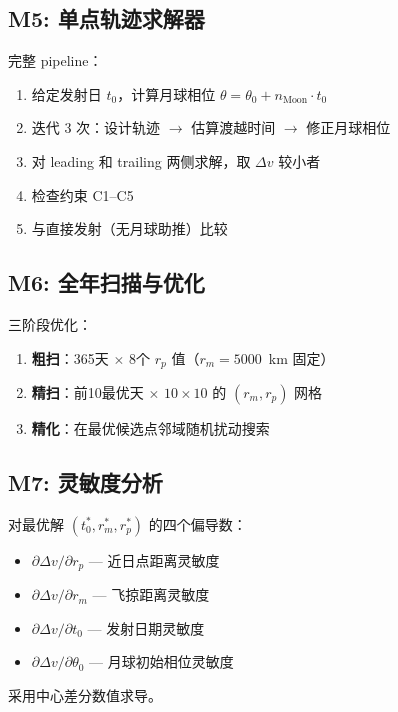 \documentclass[a4paper,12pt]{article}
\begin{document}
\subsection{M5: 单点轨迹求解器}\label{sec:m5}

完整 pipeline：
\begin{enumerate}
  \item 给定发射日 $t_0$，计算月球相位
        $\theta = \theta_0 + n_{\mathrm{Moon}} \cdot t_0$
  \item 迭代 3 次：设计轨迹 $\to$ 估算渡越时间 $\to$ 修正月球相位
  \item 对 leading 和 trailing 两侧求解，取 $\Delta v$ 较小者
  \item 检查约束 C1--C5
  \item 与直接发射（无月球助推）比较
\end{enumerate}

\subsection{M6: 全年扫描与优化}\label{sec:m6}

三阶段优化：
\begin{enumerate}
  \item \textbf{粗扫}：365天 $\times$ 8个 $r_p$ 值（$r_m = 5000$~km 固定）
  \item \textbf{精扫}：前10最优天 $\times$ $10 \times 10$ 的 $(r_m, r_p)$ 网格
  \item \textbf{精化}：在最优候选点邻域随机扰动搜索
\end{enumerate}

\subsection{M7: 灵敏度分析}\label{sec:m7}

对最优解 $(t_0^*, r_m^*, r_p^*)$ 的四个偏导数：
\begin{itemize}
  \item $\partial \Delta v / \partial r_p$ --- 近日点距离灵敏度
  \item $\partial \Delta v / \partial r_m$ --- 飞掠距离灵敏度
  \item $\partial \Delta v / \partial t_0$ --- 发射日期灵敏度
  \item $\partial \Delta v / \partial \theta_0$ --- 月球初始相位灵敏度
\end{itemize}
采用中心差分数值求导。


\end{document}
